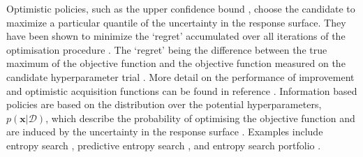 Optimistic policies, such as the upper confidence bound \cite{icml2010_129}, choose the candidate to maximize a particular quantile of the uncertainty in the response surface. They have been shown to minimize the `regret' accumulated over all iterations of the optimisation procedure \cite{icml2010_129}. The `regret' being the difference between the true maximum of the objective function and the objective function measured on the candidate hyperparameter trial \cite{berger2013statistical}. More detail on the performance of improvement and optimistic acquisition functions can be found in reference \cite{jones2001taxonomy}. Information based policies are based on the distribution over the potential hyperparameters, $p(\mathbf{x}|\mathcal{D})$, which describe the probability of optimising the objective function and are induced by the uncertainty in the response surface \cite{shahriariTakingHumanOut2016}. Examples include entropy search \cite{hennig2012entropy}, predictive entropy search \cite{hernandez2014predictive}, and entropy search portfolio \cite{shahriariEntropySearchPortfolio2015}.  


